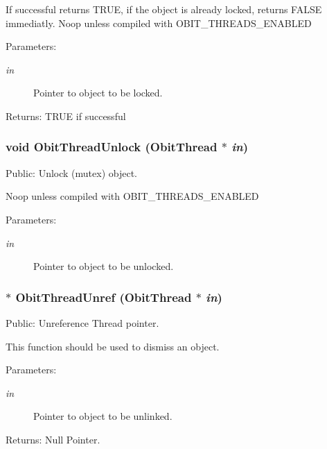 If successful returns TRUE, if the object is already locked, returns FALSE immediatly. Noop unless compiled with OBIT\_\-THREADS\_\-ENABLED \begin{Desc}
\item[Parameters:]
\begin{description}
\item[{\em in}]Pointer to object to be locked. \end{description}
\end{Desc}
\begin{Desc}
\item[Returns:]TRUE if successful \end{Desc}
\subsubsection{\setlength{\rightskip}{0pt plus 5cm}void Obit\-Thread\-Unlock ({\bf Obit\-Thread} $\ast$ {\em in})}\label{ObitThread_8h_a8}


Public: Unlock (mutex) object. 

Noop unless compiled with OBIT\_\-THREADS\_\-ENABLED \begin{Desc}
\item[Parameters:]
\begin{description}
\item[{\em in}]Pointer to object to be unlocked. \end{description}
\end{Desc}
\subsubsection{$\ast$ Obit\-Thread\-Unref ({\bf Obit\-Thread} $\ast$ {\em in})}\label{ObitThread_8h_a5}


Public: Unreference Thread pointer. 

This function should be used to dismiss an object. \begin{Desc}
\item[Parameters:]
\begin{description}
\item[{\em in}]Pointer to object to be unlinked. \end{description}
\end{Desc}
\begin{Desc}
\item[Returns:]Null Pointer. \end{Desc}
